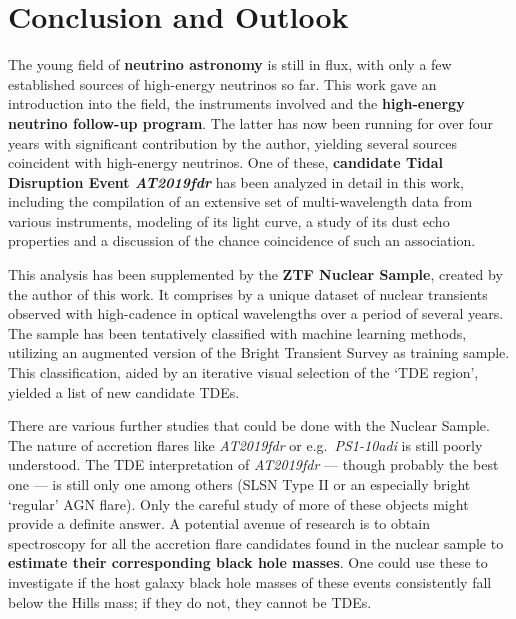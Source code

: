 \chapter*{Conclusion and Outlook}\label{conclusion}
The young field of \textbf{neutrino astronomy} is still in flux, with only a few established sources of high-energy neutrinos so far. This work gave an introduction into the field, the instruments involved and the \textbf{high-energy neutrino follow-up program}. The latter has now been running for over four years with significant contribution by the author, yielding several sources coincident with high-energy neutrinos. One of these, \textbf{candidate Tidal Disruption Event \textit{AT2019fdr}} has been analyzed in detail in this work, including the compilation of an extensive set of multi-wavelength data from various instruments, modeling of its light curve, a study of its dust echo properties and a discussion of the chance coincidence of such an association.

This analysis has been supplemented by the \textbf{ZTF Nuclear Sample}, created by the author of this work. It comprises by a unique dataset of nuclear transients observed with high-cadence in optical wavelengths over a period of several years. The sample has been tentatively classified with machine learning methods, utilizing an augmented version of the Bright Transient Survey as training sample. This classification, aided by an iterative visual selection of the `TDE region', yielded a list of new candidate TDEs.

There are various further studies that could be done with the Nuclear Sample. The nature of accretion flares like \textit{AT2019fdr} or e.g.~\textit{PS1-10adi} is still poorly understood. The TDE interpretation of \textit{AT2019fdr} --- though probably the best one ---  is still only one among others (SLSN Type II or an especially bright `regular' AGN flare). Only the careful study of more of these objects might provide a definite answer. A potential avenue of research is to obtain spectroscopy for all the accretion flare candidates found in the nuclear sample to \textbf{estimate their corresponding black hole masses}. One could use these to investigate if the host galaxy black hole masses of these events consistently fall below the Hills mass; if they do not, they cannot be TDEs.

